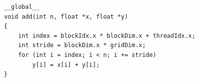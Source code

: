 \begin{lstlisting}[language=MyC++,
caption=Beispielhafter CUDA-Kernel zum Iterieren über zwei Datensätze \cite{Harris2017},
label=cuda_example]
__global__
void add(int n, float *x, float *y)
{
	int index = blockIdx.x * blockDim.x + threadIdx.x;
	int stride = blockDim.x * gridDim.x;
	for (int i = index; i < n; i += stride)
		y[i] = x[i] + y[i];
}
\end{lstlisting}